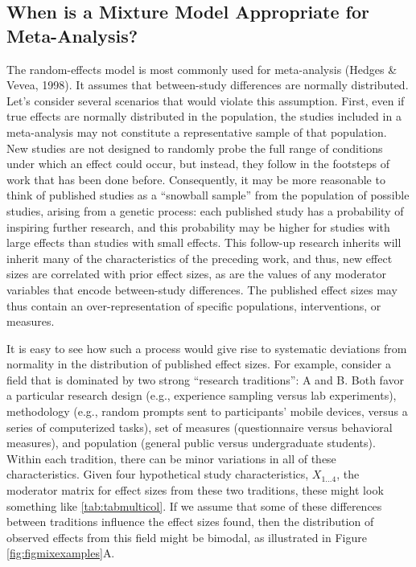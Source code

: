 \documentclass[
  english,
  man, noextraspace,floatsintext]{apa6}
\begin{document}
\subsection{When is a Mixture Model Appropriate for Meta-Analysis?}\label{when-is-a-mixture-model-appropriate-for-meta-analysis}

The random-effects model is most commonly used for meta-analysis (Hedges \& Vevea, 1998).
It assumes that between-study differences are normally distributed.
Let's consider several scenarios that would violate this assumption.
First, even if true effects are normally distributed in the population,
the studies included in a meta-analysis may not constitute a representative sample of that population.
New studies are not designed to randomly probe the full range of conditions under which an effect could occur, but instead, they follow in the footsteps of work that has been done before.
Consequently, it may be more reasonable to think of published studies as a ``snowball sample'' from the population of possible studies, arising from a genetic process: each published study has a probability of inspiring further research, and this probability may be higher for studies with large effects than studies with small effects.
This follow-up research inherits will inherit many of the characteristics of the preceding work, and thus, new effect sizes are correlated with prior effect sizes,
as are the values of any moderator variables that encode between-study differences.
The published effect sizes may thus contain an over-representation of specific populations,
interventions, or measures.

It is easy to see how such a process would give rise to systematic deviations from normality in the distribution of published effect sizes.
For example, consider a field that is dominated by two strong ``research traditions'': A and B.
Both favor a particular research design (e.g., experience sampling versus lab experiments), methodology (e.g., random prompts sent to participants' mobile devices, versus a series of computerized tasks), set of measures (questionnaire versus behavioral measures), and population (general public versus undergraduate students).
Within each tradition, there can be minor variations in all of these characteristics.
Given four hypothetical study characteristics, \(X_{1\ldots4}\), the moderator matrix for effect sizes from these two traditions, these might look something like \ref{tab:tabmulticol}.
If we assume that some of these differences between traditions influence the effect sizes found, then the distribution of observed effects from this field might be bimodal, as illustrated in Figure \ref{fig:figmixexamples}A.
\end{document}
